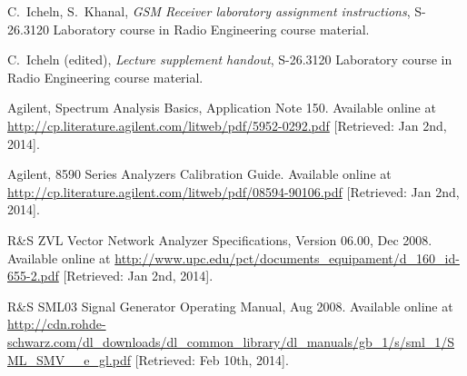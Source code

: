 \documentclass[a4paper, 12pt]{article}
\begin{document}
\newpage
\begin{thebibliography}{9}%

 C.\ Icheln, S.\ Khanal, 
	\textit{GSM Receiver laboratory assignment instructions},
	S-26.3120 Laboratory course in Radio Engineering course material.
	
 C.\ Icheln (edited), 
	\textit{Lecture supplement handout},
	S-26.3120 Laboratory course in Radio Engineering course material.

 Agilent, Spectrum Analysis Basics, Application Note 150. 
	Available online at \url{http://cp.literature.agilent.com/litweb/pdf/5952-0292.pdf} 
	[Retrieved: Jan 2nd, 2014].
	
 Agilent, 8590 Series Analyzers Calibration Guide.
	Available online at \url{http://cp.literature.agilent.com/litweb/pdf/08594-90106.pdf}
	[Retrieved: Jan 2nd, 2014].
	
 R\&S ZVL Vector Network Analyzer Specifications, 
	Version 06.00, Dec 2008. 
	Available online at \url{http://www.upc.edu/pct/documents_equipament/d_160_id-655-2.pdf} 
	[Retrieved: Jan 2nd, 2014].
	
 R\&S SML03 Signal Generator Operating Manual,
	Aug 2008.
	Available online at \url{http://cdn.rohde-schwarz.com/dl_downloads/dl_common_library/dl_manuals/gb_1/s/sml_1/SML_SMV__e_gl.pdf}
	[Retrieved: Feb 10th, 2014].


	

	

\end{thebibliography}
\end{document}
